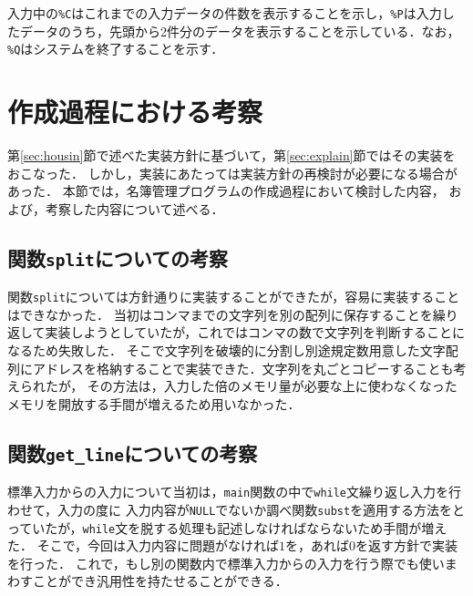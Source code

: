 \documentclass[a4j,11pt]{jarticle}
\begin{document}
\noindent
入力中の\verb|%C|はこれまでの入力データの件数を表示することを示し，\verb|%P|は入力したデータのうち，先頭から2件分のデータを表示することを示している．なお，\verb|%Q|はシステムを終了することを示す．

\section{作成過程における考察}


第\ref{sec:housin}節で述べた実装方針に基づいて，第\ref{sec:explain}節ではその実装をおこなった．
しかし，実装にあたっては実装方針の再検討が必要になる場合があった．
本節では，名簿管理プログラムの作成過程において検討した内容，
および，考察した内容について述べる．

\subsection{関数\texttt{split}についての考察}

関数\verb|split|については方針通りに実装することができたが，容易に実装することはできなかった．
当初はコンマまでの文字列を別の配列に保存することを繰り返して実装しようとしていたが，これではコンマの数で文字列を判断することになるため失敗した．
そこで文字列を破壊的に分割し別途規定数用意した文字配列にアドレスを格納することで実装できた．文字列を丸ごとコピーすることも考えられたが，
その方法は，入力した倍のメモリ量が必要な上に使わなくなったメモリを開放する手間が増えるため用いなかった．

\subsection{関数\texttt{get\_line}についての考察}
標準入力からの入力について当初は，\verb|main|関数の中で\verb|while|文繰り返し入力を行わせて，入力の度に
入力内容が\verb|NULL|でないか調べ関数\verb|subst|を適用する方法をとっていたが，\verb|while|文を脱する処理も記述しなければならないため手間が増えた．
そこで，今回は入力内容に問題がなければ$1$を，あれば$0$を返す方針で実装を行った．
これで，もし別の関数内で標準入力からの入力を行う際でも使いまわすことができ汎用性を持たせることができる．
\end{document}
